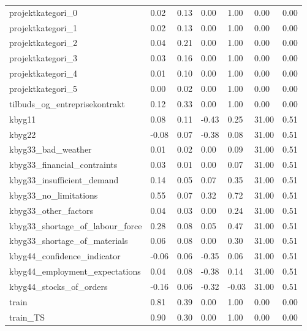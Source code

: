 \begin{landscape}
\begin{longtable}[h!]{lllllll}
projektkategori_0 & 0.02 & 0.13 & 0.00 & 1.00 & 0.00 & 0.00 \\
projektkategori_1 & 0.02 & 0.13 & 0.00 & 1.00 & 0.00 & 0.00 \\
projektkategori_2 & 0.04 & 0.21 & 0.00 & 1.00 & 0.00 & 0.00 \\
projektkategori_3 & 0.03 & 0.16 & 0.00 & 1.00 & 0.00 & 0.00 \\
projektkategori_4 & 0.01 & 0.10 & 0.00 & 1.00 & 0.00 & 0.00 \\
projektkategori_5 & 0.00 & 0.02 & 0.00 & 1.00 & 0.00 & 0.00 \\
tilbuds_og_entreprisekontrakt & 0.12 & 0.33 & 0.00 & 1.00 & 0.00 & 0.00 \\
kbyg11 & 0.08 & 0.11 & -0.43 & 0.25 & 31.00 & 0.51 \\
kbyg22 & -0.08 & 0.07 & -0.38 & 0.08 & 31.00 & 0.51 \\
kbyg33_bad_weather & 0.01 & 0.02 & 0.00 & 0.09 & 31.00 & 0.51 \\
kbyg33_financial_contraints & 0.03 & 0.01 & 0.00 & 0.07 & 31.00 & 0.51 \\
kbyg33_insufficient_demand & 0.14 & 0.05 & 0.07 & 0.35 & 31.00 & 0.51 \\
kbyg33_no_limitations & 0.55 & 0.07 & 0.32 & 0.72 & 31.00 & 0.51 \\
kbyg33_other_factors & 0.04 & 0.03 & 0.00 & 0.24 & 31.00 & 0.51 \\
kbyg33_shortage_of_labour_force & 0.28 & 0.08 & 0.05 & 0.47 & 31.00 & 0.51 \\
kbyg33_shortage_of_materials & 0.06 & 0.08 & 0.00 & 0.30 & 31.00 & 0.51 \\
kbyg44_confidence_indicator & -0.06 & 0.06 & -0.35 & 0.06 & 31.00 & 0.51 \\
kbyg44_employment_expectations & 0.04 & 0.08 & -0.38 & 0.14 & 31.00 & 0.51 \\
kbyg44_stocks_of_orders & -0.16 & 0.06 & -0.32 & -0.03 & 31.00 & 0.51 \\
train & 0.81 & 0.39 & 0.00 & 1.00 & 0.00 & 0.00 \\
train_TS & 0.90 & 0.30 & 0.00 & 1.00 & 0.00 & 0.00 \\
\end{longtable}\end{landscape}
